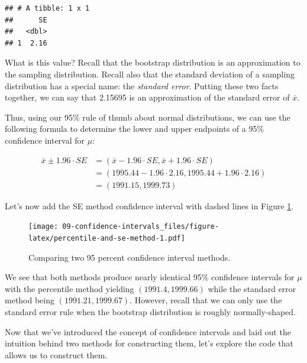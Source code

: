 \documentclass[
]{book}
\newenvironment{Shaded}{\begin{snugshade}}{\end{snugshade}}
\newcommand{\DataTypeTok}[1]{\textcolor[rgb]{0.13,0.29,0.53}{#1}}
\newcommand{\KeywordTok}[1]{\textcolor[rgb]{0.13,0.29,0.53}{\textbf{#1}}}
\newcommand{\NormalTok}[1]{#1}
\newcommand{\OperatorTok}[1]{\textcolor[rgb]{0.81,0.36,0.00}{\textbf{#1}}}
\newcommand{\StringTok}[1]{\textcolor[rgb]{0.31,0.60,0.02}{#1}}
\begin{document}
\begin{Shaded}
\end{Shaded}

\begin{verbatim}
## # A tibble: 1 x 1
##      SE
##   <dbl>
## 1  2.16
\end{verbatim}

What is this value? Recall that the bootstrap distribution is an approximation to the sampling distribution. Recall also that the standard deviation of a sampling distribution has a special name: the \emph{standard error}. Putting these two facts together, we can say that 2.15695 is an approximation of the standard error of \(\overline{x}\).

Thus, using our 95\% rule of thumb about normal distributions, we can use the following formula to determine the lower and upper endpoints of a 95\% confidence interval for \(\mu\):

\[
\begin{aligned}
\overline{x} \pm 1.96 \cdot SE &= (\overline{x} - 1.96 \cdot SE, \overline{x} + 1.96 \cdot SE)\\
&= (1995.44 - 1.96 \cdot 2.16, 1995.44 + 1.96 \cdot 2.16)\\
&= (1991.15, 1999.73)
\end{aligned}
\]

Let's now add the SE method confidence interval with dashed lines in Figure \ref{fig:percentile-and-se-method}.

\begin{figure}
\centering
\texttt{[image: 09-confidence-intervals\_files/figure-latex/percentile-and-se-method-1.pdf]}
\caption{\label{fig:percentile-and-se-method}Comparing two 95 percent confidence interval methods.}
\end{figure}

We see that both methods produce nearly identical 95\% confidence intervals for \(\mu\) with the percentile method yielding \((1991.4, 1999.66)\) while the standard error method being \((1991.21, 1999.67)\). However, recall that we can only use the standard error rule when the bootstrap distribution is roughly normally-shaped.

Now that we've introduced the concept of confidence intervals and laid out the intuition behind two methods for constructing them, let's explore the code that allows us to construct them.
\end{document}
